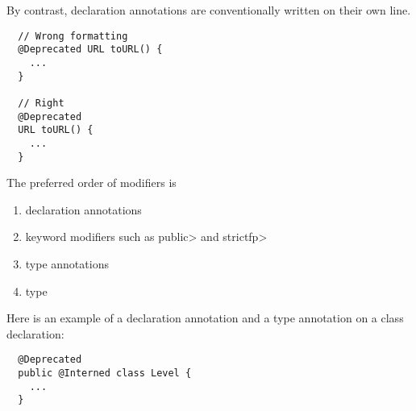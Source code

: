 By contrast, declaration annotations are conventionally written on their own line.

\begin{Verbatim}
  // Wrong formatting
  @Deprecated URL toURL() {
    ...
  }

  // Right
  @Deprecated
  URL toURL() {
    ...
  }
\end{Verbatim}

The preferred order of modifiers is
\begin{enumerate}
\item declaration annotations
\item keyword modifiers such as \<public> and \<strictfp>
\item type annotations
\item type
\end{enumerate}

Here is an example of a declaration annotation and a type annotation on a class declaration:

\begin{Verbatim}
  @Deprecated
  public @Interned class Level {
    ...
  }
\end{Verbatim}

%
%
%
%

